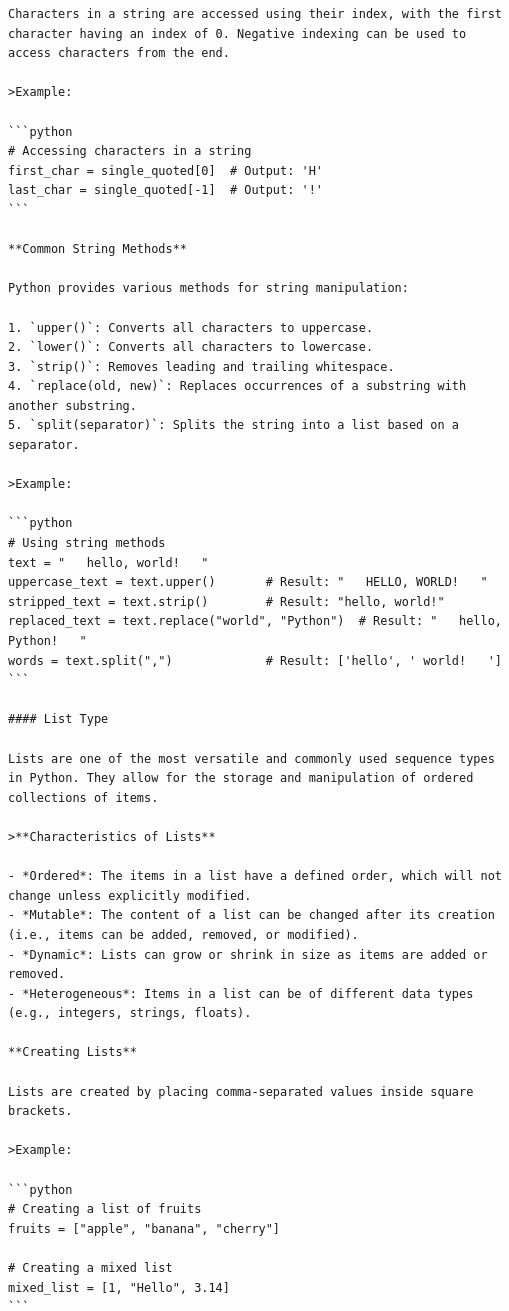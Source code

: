 \documentclass[
  letterpaper,
  DIV=11,
  numbers=noendperiod]{scrreprt}
\theoremstyle{plain}
\theoremstyle{definition}
\theoremstyle{remark}
\begin{document}
\begin{verbatim}
Characters in a string are accessed using their index, with the first character having an index of 0. Negative indexing can be used to access characters from the end.

>Example:

```python
# Accessing characters in a string
first_char = single_quoted[0]  # Output: 'H'
last_char = single_quoted[-1]  # Output: '!'
```

**Common String Methods**

Python provides various methods for string manipulation:

1. `upper()`: Converts all characters to uppercase.
2. `lower()`: Converts all characters to lowercase.
3. `strip()`: Removes leading and trailing whitespace.
4. `replace(old, new)`: Replaces occurrences of a substring with another substring.
5. `split(separator)`: Splits the string into a list based on a separator.

>Example:

```python
# Using string methods
text = "   hello, world!   "
uppercase_text = text.upper()       # Result: "   HELLO, WORLD!   "
stripped_text = text.strip()        # Result: "hello, world!"
replaced_text = text.replace("world", "Python")  # Result: "   hello, Python!   "
words = text.split(",")             # Result: ['hello', ' world!   ']
```

#### List Type

Lists are one of the most versatile and commonly used sequence types in Python. They allow for the storage and manipulation of ordered collections of items.

>**Characteristics of Lists**

- *Ordered*: The items in a list have a defined order, which will not change unless explicitly modified.
- *Mutable*: The content of a list can be changed after its creation (i.e., items can be added, removed, or modified).
- *Dynamic*: Lists can grow or shrink in size as items are added or removed.
- *Heterogeneous*: Items in a list can be of different data types (e.g., integers, strings, floats).

**Creating Lists**

Lists are created by placing comma-separated values inside square brackets.

>Example:

```python
# Creating a list of fruits
fruits = ["apple", "banana", "cherry"]

# Creating a mixed list
mixed_list = [1, "Hello", 3.14]
``` 


\end{verbatim}
\end{document}
